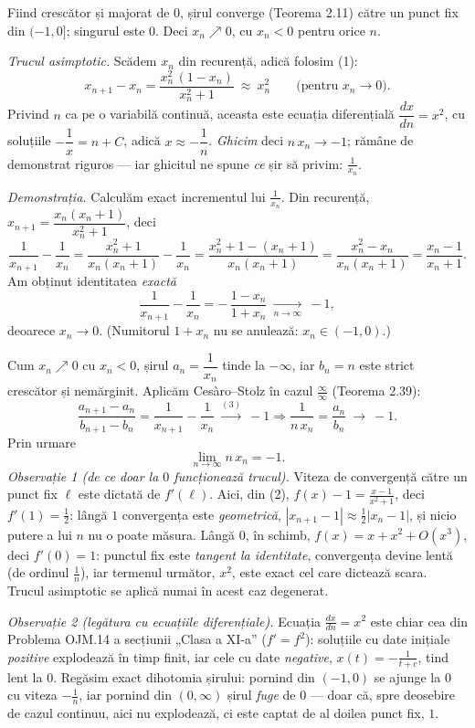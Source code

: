Fiind crescător și majorat de $0$, șirul converge (Teorema 2.11) către un punct fix din $(-1,0]$; singurul este $0$. Deci $x_n\nearrow0$, cu $x_n<0$ pentru orice $n$.

\emph{Trucul asimptotic.} Scădem $x_n$ din recurență, adică folosim (1):
\[ x_{n+1}-x_n=\frac{x_n^{2}\,(1-x_n)}{x_n^{2}+1}\ \approx\ x_n^{2}\qquad\text{(pentru }x_n\to0\text{)} . \]
Privind $n$ ca pe o variabilă continuă, aceasta este ecuația diferențială $\dfrac{dx}{dn}=x^{2}$, cu soluțiile $-\dfrac1x=n+C$, adică $x\approx-\dfrac1n$. \emph{Ghicim} deci $n\,x_n\to-1$; rămâne de demonstrat riguros --- iar ghicitul ne spune \emph{ce} șir să privim: $\frac1{x_n}$.

\emph{Demonstrația.} Calculăm exact incrementul lui $\frac1{x_n}$. Din recurență, $x_{n+1}=\dfrac{x_n(x_n+1)}{x_n^{2}+1}$, deci
\[ \frac{1}{x_{n+1}}-\frac{1}{x_n}=\frac{x_n^{2}+1}{x_n(x_n+1)}-\frac1{x_n}=\frac{x_n^{2}+1-(x_n+1)}{x_n(x_n+1)}=\frac{x_n^{2}-x_n}{x_n(x_n+1)}=\frac{x_n-1}{x_n+1} . \]
Am obținut identitatea \emph{exactă}
\[ \frac{1}{x_{n+1}}-\frac{1}{x_n}=-\,\frac{1-x_n}{1+x_n}\ \xrightarrow[n\to\infty]{}\ -1 , \tag{3} \]
deoarece $x_n\to0$. (Numitorul $1+x_n$ nu se anulează: $x_n\in(-1,0)$.)

Cum $x_n\nearrow0$ cu $x_n<0$, șirul $a_n=\dfrac1{x_n}$ tinde la $-\infty$, iar $b_n=n$ este strict crescător și nemărginit. Aplicăm Cesàro--Stolz în cazul $\frac{\infty}{\infty}$ (Teorema 2.39):
\[ \frac{a_{n+1}-a_n}{b_{n+1}-b_n}=\frac{1}{x_{n+1}}-\frac{1}{x_n}\ \overset{(3)}{\longrightarrow}\ -1 \Longrightarrow \frac{1}{n\,x_n}=\frac{a_n}{b_n}\ \longrightarrow\ -1 . \]
Prin urmare
\[ \lim_{n\to\infty}n\,x_n=-1 . \]
\emph{Observație 1 (de ce doar la $0$ funcționează trucul).} Viteza de convergență către un punct fix $\ell$ este dictată de $f'(\ell)$. Aici, din (2), $f(x)-1=\frac{x-1}{x^{2}+1}$, deci $f'(1)=\frac12$: lângă $1$ convergența este \emph{geometrică}, $|x_{n+1}-1|\approx\frac12|x_n-1|$, și nicio putere a lui $n$ nu o poate măsura. Lângă $0$, în schimb, $f(x)=x+x^{2}+O(x^{3})$, deci $f'(0)=1$: punctul fix este \emph{tangent la identitate}, convergența devine lentă (de ordinul $\frac1n$), iar termenul următor, $x^{2}$, este exact cel care dictează scara. Trucul asimptotic se aplică numai în acest caz degenerat.

\emph{Observație 2 (legătura cu ecuațiile diferențiale).} Ecuația $\frac{dx}{dn}=x^{2}$ este chiar cea din Problema OJM.14 a secțiunii „Clasa a XI-a'' ($f'=f^{2}$): soluțiile cu date inițiale \emph{pozitive} explodează în timp finit, iar cele cu date \emph{negative}, $x(t)=-\frac{1}{t+c}$, tind lent la $0$. Regăsim exact dihotomia șirului: pornind din $(-1,0)$ se ajunge la $0$ cu viteza $-\frac1n$, iar pornind din $(0,\infty)$ șirul \emph{fuge} de $0$ --- doar că, spre deosebire de cazul continuu, aici nu explodează, ci este captat de al doilea punct fix, $1$.

